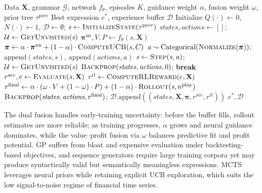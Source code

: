 \begin{algorithm}[htbp]
\caption{Neural-Guided MCTS for Symbolic Regression}
\label{alg:mcts}
\begin{algorithmic}[1]
\Require Data $\mathbf{X}$, grammar $\mathcal{G}$, network $f_{\theta}$, episodes $K$, guidance weight $\alpha$, fusion weight $\omega$, prior tree $\tau^{\text{prev}}$
\Ensure Best expression $e^{*}$, experience buffer $\mathcal{D}$
\State Initialize $Q(\cdot) \leftarrow 0$, $N(\cdot) \leftarrow 1$, $\mathcal{D} \leftarrow \emptyset$; $\mathit{s} \leftarrow \textsc{InitializeState}(\tau^{\text{prev}})$
    \State $\mathit{states}, \mathit{actions} \leftarrow []$; $\mathcal{U} \leftarrow \textsc{GetUnvisited}(\mathit{s})$
     
        \State $\boldsymbol{\pi}^{\text{nn}}, V, P \leftarrow f_{\theta}(\mathit{s}, \mathbf{X})$
        \State $\boldsymbol{\pi} \leftarrow \alpha \cdot \boldsymbol{\pi}^{\text{nn}} + (1-\alpha) \cdot \textsc{ComputeUCB}(\mathit{s}, C)$
        \State $\mathit{a} \sim \text{Categorical}(\textsc{Normalize}(\boldsymbol{\pi}))$; $\text{append}(\mathit{states}, \mathit{s})$, $\text{append}(\mathit{actions}, \mathit{a})$
        \State $\mathit{s} \leftarrow \textsc{Step}(\mathit{s}, \mathit{a})$; $\mathcal{U} \leftarrow \textsc{GetUnvisited}(\mathit{s})$
         \State $\textsc{Backprop}(\mathit{states}, \mathit{actions}, 0)$; \textbf{break} \EndIf
    \EndWhile
    \State $r^{\text{acc}}, e \leftarrow \textsc{Evaluate}(\mathit{s}, \mathbf{X})$ 
    \State $r^{\text{rl}} \leftarrow \textsc{ComputeRLReward}(e, \mathbf{X})$ 
    \State $r^{\text{final}} \leftarrow \alpha \cdot (\omega \cdot V + (1-\omega) \cdot P) + (1-\alpha) \cdot \textsc{Rollout}(\mathit{s}, n^{\text{play}})$
    \State $\textsc{Backprop}(\mathit{states}, \mathit{actions}, r^{\text{final}})$; $\mathcal{D}.\text{append}((\mathit{states}, \mathbf{X}, \boldsymbol{\pi}, r^{\text{acc}}, r^{\text{rl}}))$
\EndFor
\State \Return $e^{*}, \mathcal{D}$
\end{algorithmic}
\end{algorithm}

The dual fusion handles early-training uncertainty: before the buffer fills, rollout estimates are more reliable; as training progresses, $\alpha$ grows and neural guidance dominates, while the value--profit fusion via $\omega$ balances predictive fit and profit potential. GP suffers from bloat and expensive evaluation under backtesting-based objectives, and sequence generators require large training corpora yet may produce syntactically valid but semantically meaningless expressions. MCTS leverages neural priors while retaining explicit UCB exploration, which suits the low signal-to-noise regime of financial time series.

